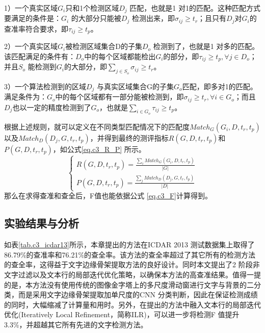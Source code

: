         1）一个真实区域$G_i$只和1个检测区域$D_j$ 匹配，也就是1 对1的匹配。这种匹配方式要满足的条件是：$G_i$ 的大部分只能被$D_j$ 检测出来，即$\sigma_{ij} \ge t_r$；且只有$D_j$对$G_i$的查准率符合要求，即$\tau_{ij} \ge t_p$。

        2）一个真实区域$G_i$被检测区域集合D的子集$D_o$ 检测到了，也就是1 对多的匹配。该匹配满足的条件有：$D_o$中的每个区域都能检出$G_i$的部分，即$\tau_{ij} \ge t_p,\forall j \in D_o$；并且$S_o$ 能检测到$G_i$的大部分，即$\sum_{j \in S_o} \sigma_{ij} \ge t_r$。

        3）一个算法检测到的区域$D_j$ 与真实区域集合G的子集$G_o$匹配，即多对1的匹配。满足条件为：$G_o$中的每个区域都有一部分能被检测到，即$\sigma_{ij} \ge t_r,\forall i \in G_o$；而且$D_j$也以一定的精度检测到了$G_o$，也就是$\sum_{i \in G_o} \tau_{ij} \ge t_p$。

        根据上述规则，就可以定义在不同类型匹配情况下的匹配度$Match_G(G_i,D,t_r,t_p)$ 以及$Match_D(D_j,G,t_r,t_p)$，并得到最终的测评指标$R(G,D,t_r,t_p)$和$P(G,D,t_r,t_p)$，如公式\ref{eq.c3_R_P} 所示。
        \begin{equation}
        \left\{
        \begin{array}{c}
        R(G,D,t_r,t_p)=\frac{\sum_i Match_G(G_i,D,t_r,t_p)}{|G|}\\
        P(G,D,t_r,t_p)=\frac{\sum_j Match_D(D_j,G,t_r,t_p)}{|D|}
        \end{array}
        \right.
        \label{eq.c3_R_P}
        \end{equation}
        那么在求得查准和查全后，F值也能依据公式 \ref{eq.c3_F}计算得到。

        \subsection{实验结果与分析}

        如表\ref{tab.c3_icdar13}所示，本章提出的方法在ICDAR 2013 测试数据集上取得了86.79\%的查准率和76.21\%的查全率。该方法的查全率超过了其它所有的检测方法的查全率，这得益于文字边缘骨架提取方法的良好设计。同时本文提出了2 阶段非文字过滤以及文本行的局部迭代优化策略，以确保本方法的高查准结果。值得一提的是，本方法没有使用传统的图像金字塔上的多尺度滑动窗进行文字与背景的二分类，而是采用文字边缘骨架提取加单尺度的CNN 分类判断，因此在保证检测成绩的同时，大幅缩减了计算量和用时。另外，在提出的方法中融入文本行的局部迭代优化(Iteratively Local Refinement，简称ILR)，可以进一步将检测F 值提升3.3\%，并超越其它所有先进的文字检测方法。

